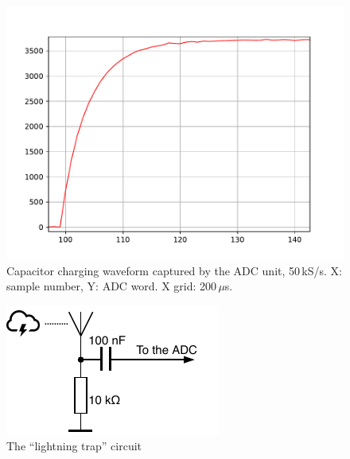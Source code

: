 \begin{figure}[h]
\centering
\includegraphics[width=\textwidth]{img/transient.pdf}
\caption[Capacitor charging waveform captured by the ADC unit]{Capacitor charging waveform captured by the ADC unit, 50\,kS/s. X: sample number, Y: ADC word. X grid: 200\,$\mu$s.}
\label{fig:captransient}
\end{figure}

\begin{figure}[b]
\centering
\includegraphics[scale=1.2]{img/thundertrap.pdf}
\caption{The ``lightning trap'' circuit}
\label{fig:lightningtrap}
\end{figure}

